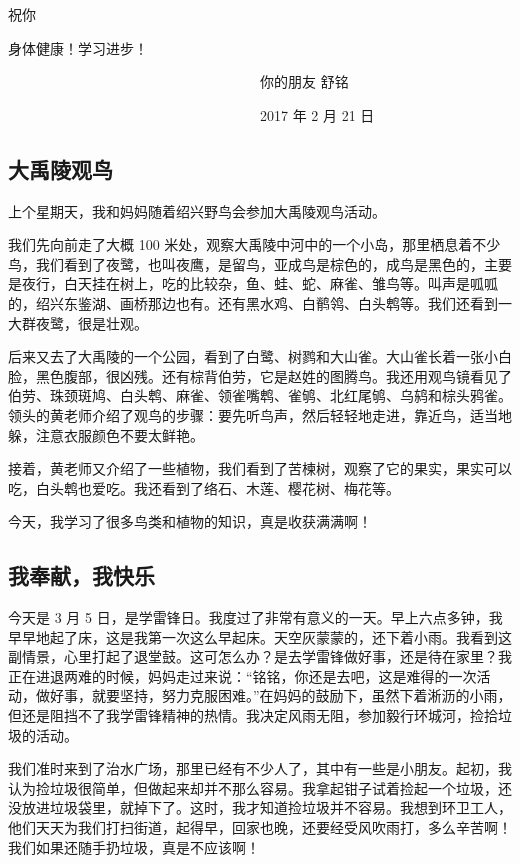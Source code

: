 \documentclass[UTF8,a4paper,titlepage,twoside,10.5pt]{article}
\begin{document}
祝你

身体健康！学习进步！

　　　　　　　　　　　　　　　　　　你的朋友  舒铭

　　　　　　　　　　　　　　　　　　2017 年 2 月 21 日

\subsection{大禹陵观鸟}
\label{sec:orgeca3103}

上个星期天，我和妈妈随着绍兴野鸟会参加大禹陵观鸟活动。

我们先向前走了大概 100 米处，观察大禹陵中河中的一个小岛，那里栖息着不少鸟，我们看到了夜鹭，也叫夜鹰，是留鸟，亚成鸟是棕色的，成鸟是黑色的，主要是夜行，白天挂在树上，吃的比较杂，鱼、蛙、蛇、麻雀、雏鸟等。叫声是呱呱的，绍兴东鉴湖、画桥那边也有。还有黑水鸡、白鹡鸰、白头鹎等。我们还看到一大群夜鹭，很是壮观。

后来又去了大禹陵的一个公园，看到了白鹭、树鹨和大山雀。大山雀长着一张小白脸，黑色腹部，很凶残。还有棕背伯劳，它是赵姓的图腾鸟。我还用观鸟镜看见了伯劳、珠颈斑鸠、白头鹎、麻雀、领雀嘴鹎、雀鸲、北红尾鸲、乌鸫和棕头鸦雀。领头的黄老师介绍了观鸟的步骤：要先听鸟声，然后轻轻地走进，靠近鸟，适当地躲，注意衣服颜色不要太鲜艳。

接着，黄老师又介绍了一些植物，我们看到了苦楝树，观察了它的果实，果实可以吃，白头鹎也爱吃。我还看到了络石、木莲、樱花树、梅花等。

今天，我学习了很多鸟类和植物的知识，真是收获满满啊！

\subsection{我奉献，我快乐}
\label{sec:orgfd15d38}

今天是 3 月 5 日，是学雷锋日。我度过了非常有意义的一天。早上六点多钟，我早早地起了床，这是我第一次这么早起床。天空灰蒙蒙的，还下着小雨。我看到这副情景，心里打起了退堂鼓。这可怎么办？是去学雷锋做好事，还是待在家里？我正在进退两难的时候，妈妈走过来说：“铭铭，你还是去吧，这是难得的一次活动，做好事，就要坚持，努力克服困难。”在妈妈的鼓励下，虽然下着淅沥的小雨，但还是阻挡不了我学雷锋精神的热情。我决定风雨无阻，参加毅行环城河，捡拾垃圾的活动。

我们准时来到了治水广场，那里已经有不少人了，其中有一些是小朋友。起初，我认为捡垃圾很简单，但做起来却并不那么容易。我拿起钳子试着捡起一个垃圾，还没放进垃圾袋里，就掉下了。这时，我才知道捡垃圾并不容易。我想到环卫工人，他们天天为我们打扫街道，起得早，回家也晚，还要经受风吹雨打，多么辛苦啊！我们如果还随手扔垃圾，真是不应该啊！
\end{document}
